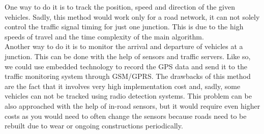 \documentclass[17pt]{report}
\begin{document}
\indent \indent
One way to do it is to track the position, speed and direction of the given
vehicles. Sadly, this method would work only for a road network,
it can not solely control the traffic signal timing for just one junction. 
This is due to the high speeds of travel and the time 
complexity of the main algorithm.\\ 
\indent \indent
Another way to do it is to monitor the arrival and departure of vehicles at a
junction. This can be done with the help of sensors and traffic servers.
Like so, we could use embedded technology to record the GPS data and send it to
the traffic monitoring system through GSM/GPRS. The drawbacks of this method
are the fact that it involves very high implementation cost and, sadly, some
vehicles can not be tracked using radio detection systems. This problem can
be also approached with the help of in-road sensors, but it would require even higher 
costs as you would need to often change the sensors because roads need to be
rebuilt due to wear or ongoing constructions periodically.
\end{document}
